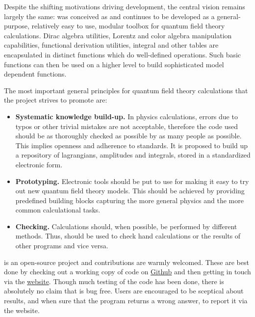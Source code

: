 Despite the shifting motivations driving development, the central vision remains
largely the same:
\fc was conceived as and continues to be developed as a general-purpose, relatively easy to use,
modular toolbox for quantum field theory calculations.
Dirac algebra utilities, Lorentz and color algebra manipulation capabilities, 
functional derivation utilities, integral and other tables are encapsulated in
distinct functions which do well-defined operations.
Such basic functions can then be used on a higher level to build sophisticated model dependent
functions.

The most important general principles for quantum field theory calculations that the \fc project
strives to promote are:

\begin{itemize}

%

\item{{\bf Systematic knowledge build-up.} In physics calculations, errors due to typos or
other trivial mistakes are not acceptable, therefore the code used should be as thoroughly
checked as possible by as many people as possible. This implies openness and adherence to
standards. It is proposed to build up a repository of lagrangians, amplitudes and integrals,
stored in a standardized electronic form.}

\item{{\bf Prototyping.} Electronic tools should be put to use for making it easy to
try out new quantum field theory models. This should be achieved by providing predefined
building blocks capturing the more general physics and the more common calculational tasks.}

\item{{\bf Checking.} Calculations should, when possible, be performed by different methods.
Thus, \fc should be used to check hand calculations or the results of other programs and
vice versa.}

\end{itemize}

\fc is an open-source project and contributions are warmly welcomed. These are
best done by checking out a working copy of code on
\href{http://github.org/FeynCalc/feyncalc}{Github} and then getting in touch via
the \href{http://www.feyncalc.org/}{website}. Though
much testing of the code has been done, there is absolutely no claim that \fc is
bug free. Users are encouraged to be sceptical about results, and when sure that
the program returns a wrong answer, to report it via the website.

